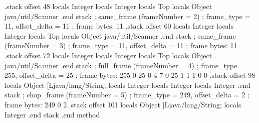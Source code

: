 \documentclass[12pt,a4paper,twoside]{report}
\begin{document}
\begin{terminal}
  .stack
    offset 48
    locals Integer
    locals Integer
    locals Top
    locals Object java/util/Scanner
    .end stack
  ; same_frame (frameNumber = 2)
  ; frame_type = 11, offset_delta = 11
  ; frame bytes: 11
  .stack
    offset 60
    locals Integer
    locals Integer
    locals Top
    locals Object java/util/Scanner
    .end stack
  ; same_frame (frameNumber = 3)
  ; frame_type = 11, offset_delta = 11
  ; frame bytes: 11
  .stack
    offset 72
    locals Integer
    locals Integer
    locals Top
    locals Object java/util/Scanner
    .end stack
  ; full_frame (frameNumber = 4)
  ; frame_type = 255, offset_delta = 25
  ; frame bytes: 255 0 25 0 4 7 0 25 1 1 1 0 0
  .stack
    offset 98
    locals Object [Ljava/lang/String;
    locals Integer
    locals Integer
    locals Integer
    .end stack
  ; chop_frame (frameNumber = 5)
  ; frame_type = 249, offset_delta = 2
  ; frame bytes: 249 0 2
  .stack
    offset 101
    locals Object [Ljava/lang/String;
    locals Integer
    .end stack
.end method
\end{terminal}
\end{document}
